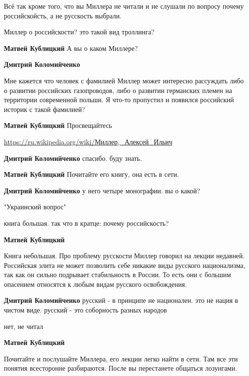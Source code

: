 \begin{itemize}

Всё так кроме того, что вы Миллера не читали и не слушали по вопросу почему
российскойсть, а не русскость выбрали.

\begin{itemize} %
Миллер о российскости? это такой вид троллинга?

\textbf{Матвей Кублицкий} А вы о каком Миллере?

\textbf{Дмитрий Коломийченко} 

Мне кажется что человек с фамилией Миллер может интересно рассуждать либо о
развитии российских газопроводов, либо о развитии германских племен на
территории современной польши. Я что-то пропустил и появился российский историк
с такой фамилией?

\textbf{Матвей Кублицкий} Просвещайтесь

\url{https://ru.wikipedia.org/wiki/Миллер,_Алексей_Ильич}

\textbf{Дмитрий Коломийченко} спасибо. буду знать.

\textbf{Матвей Кублицкий} Почитайте его книгу, она есть в сети.

\textbf{Дмитрий Коломийченко} у него четыре монографии. вы о какой?

"Украинский вопрос"

книга большая. так что в кратце: почему российскость?

\textbf{Матвей Кублицкий} 

Книга небольшая. Про проблему русскости Миллер говорил на лекции недавней.
Российская элита не может позволить себе никакие виды русского национализма,
так как он сильно подрывает стабильность в России. То есть они с большим
опасением относятся к любым видам русского освобождения.


\textbf{Дмитрий Коломийченко} русский - в принципе не национален. это не нация в чистом виде. русский - это соборность разных народов

нет, не читал

\textbf{Матвей Кублицкий} 

Почитайте и послушайте Миллера, его лекции легко найти в сети. Там все эти
понятия всесторонне разбираются. После вы перестанете общаться лозунгами.


\end{itemize}
\end{itemize}
